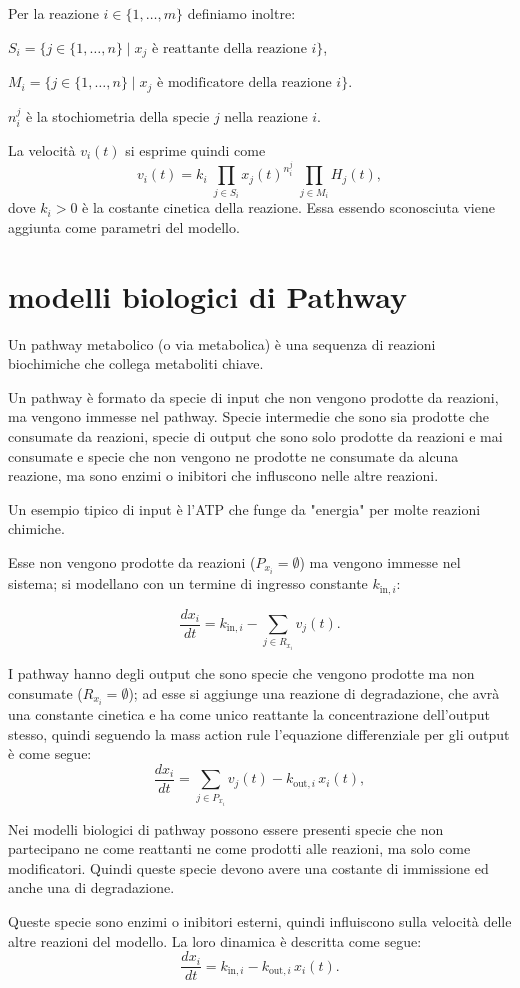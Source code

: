 Per la reazione \(i\in\{1,\dots,m\}\) definiamo inoltre:


$S_i=\{j\in\{1,\dots,n\}\mid x_j \text{ è reattante della reazione } i\}$,


$M_i=\{j\in\{1,\dots,n\}\mid x_j \text{ è modificatore della reazione } i\}$.

$n_i^j$ è la stochiometria della specie $j$ nella reazione $i$.

La velocità \(v_i(t)\) si esprime quindi come
\[
v_i(t)=k_i\;\prod_{j\in S_i} x_j(t)^{n_i^j}\;\prod_{j\in M_i} H_j(t),
\]
dove \(k_i>0\) è la costante cinetica della reazione. Essa essendo sconosciuta viene aggiunta
come parametri del modello.

\section{modelli biologici di Pathway}

Un pathway metabolico (o via metabolica)  è una sequenza di reazioni biochimiche che collega metaboliti chiave.

Un pathway è formato da specie di input che non vengono prodotte da reazioni, ma vengono immesse nel pathway.
Specie intermedie che sono sia prodotte che consumate da reazioni, specie di output che sono solo prodotte da reazioni e mai consumate
e specie che non vengono ne prodotte ne consumate da alcuna reazione, ma sono enzimi o inibitori che influscono nelle altre reazioni.

Un esempio tipico di input è l'ATP che funge da "energia" per molte reazioni chimiche.

Esse non vengono prodotte da reazioni (\(P_{x_i}=\emptyset\)) ma vengono immesse nel sistema; si modellano con un termine di ingresso constante \(k_{\mathrm{in},i}\):

\[
\frac{dx_i}{dt}=k_{\mathrm{in},i} - \sum_{j\in R_{x_i}} v_j(t).
\]

I pathway hanno degli output che sono specie che vengono prodotte ma non consumate (\(R_{x_i}=\emptyset\)); ad esse si aggiunge una reazione di degradazione, che avrà una constante cinetica e ha come unico reattante
la concentrazione dell'output stesso, quindi seguendo la mass action rule l'equazione differenziale per gli output è come segue:
\[
\frac{dx_i}{dt}=\sum_{j\in P_{x_i}} v_j(t) - k_{\mathrm{out},i}\,x_i(t),
\]

Nei modelli biologici di pathway possono essere presenti specie che non partecipano ne come reattanti ne come prodotti alle reazioni, ma solo come
modificatori. Quindi queste specie devono avere una costante di immissione ed anche una di degradazione.

Queste specie sono enzimi o inibitori esterni, quindi influiscono sulla velocità delle altre reazioni del modello. La loro dinamica è descritta come segue:
\[
\frac{dx_i}{dt}=k_{\mathrm{in},i}-k_{\mathrm{out},i}\,x_i(t).
\]

